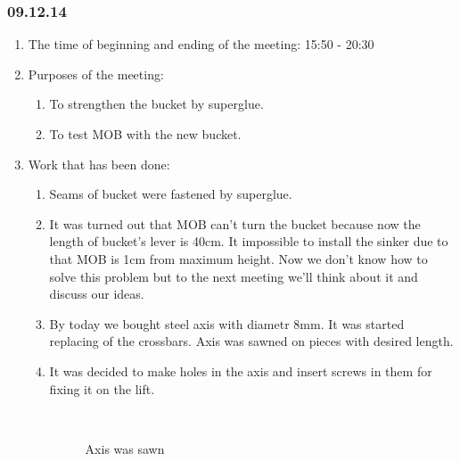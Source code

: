 \subsubsection{09.12.14}

\begin{enumerate}
	\item The time of beginning and ending of the meeting:
	15:50 - 20:30
	\item Purposes of the meeting:
	\begin{enumerate}
	  \item To strengthen the bucket by superglue.
	  
	  \item To test MOB with the new bucket.
	  
    \end{enumerate}
	\item Work that has been done:
	\begin{enumerate}
	  \item Seams of bucket were fastened by superglue.
	  
	  \item It was turned out that MOB can't turn the bucket because now the length of bucket's lever is 40cm. It impossible to install the sinker due to that MOB is 1cm from maximum height. Now we don't know how to solve this problem but to the next meeting we'll think about it and discuss our ideas.
	  
	  \item By today we bought steel axis with diametr 8mm. It was started replacing of the crossbars. Axis was sawned on pieces with desired length.
	  
	  \item It was decided to make holes in the axis and insert screws in them for fixing it on the lift.
	  
	  \begin{figure}[H]
	  	\begin{minipage}[h]{0.2\linewidth}
	  		\center  
	  	\end{minipage}
	  	\begin{minipage}[h]{0.6\linewidth}
	  		\caption{Axis was sawn}
	  	\end{minipage}
	  \end{figure}
      

\end{enumerate}
\end{enumerate}
